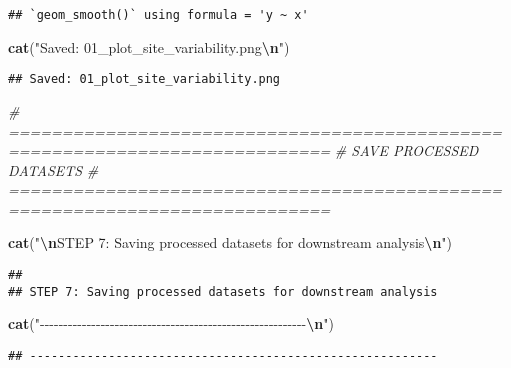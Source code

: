 \documentclass[
]{article}
\newenvironment{Shaded}{\begin{snugshade}}{\end{snugshade}}
\newcommand{\CommentTok}[1]{\textcolor[rgb]{0.56,0.35,0.01}{\textit{#1}}}
\newcommand{\FunctionTok}[1]{\textcolor[rgb]{0.13,0.29,0.53}{\textbf{#1}}}
\newcommand{\NormalTok}[1]{#1}
\newcommand{\SpecialCharTok}[1]{\textcolor[rgb]{0.81,0.36,0.00}{\textbf{#1}}}
\newcommand{\StringTok}[1]{\textcolor[rgb]{0.31,0.60,0.02}{#1}}
\begin{document}
\begin{verbatim}
## `geom_smooth()` using formula = 'y ~ x'
\end{verbatim}

\begin{Shaded}
\begin{Highlighting}[]
\FunctionTok{cat}\NormalTok{(}\StringTok{"Saved: 01\_plot\_site\_variability.png}\SpecialCharTok{\textbackslash{}n}\StringTok{"}\NormalTok{)}
\end{Highlighting}
\end{Shaded}

\begin{verbatim}
## Saved: 01_plot_site_variability.png
\end{verbatim}

\begin{Shaded}
\begin{Highlighting}[]
\CommentTok{\# ============================================================================}
\CommentTok{\# SAVE PROCESSED DATASETS}
\CommentTok{\# ============================================================================}

\FunctionTok{cat}\NormalTok{(}\StringTok{"}\SpecialCharTok{\textbackslash{}n}\StringTok{STEP 7: Saving processed datasets for downstream analysis}\SpecialCharTok{\textbackslash{}n}\StringTok{"}\NormalTok{)}
\end{Highlighting}
\end{Shaded}

\begin{verbatim}
## 
## STEP 7: Saving processed datasets for downstream analysis
\end{verbatim}

\begin{Shaded}
\begin{Highlighting}[]
\FunctionTok{cat}\NormalTok{(}\StringTok{"{-}{-}{-}{-}{-}{-}{-}{-}{-}{-}{-}{-}{-}{-}{-}{-}{-}{-}{-}{-}{-}{-}{-}{-}{-}{-}{-}{-}{-}{-}{-}{-}{-}{-}{-}{-}{-}{-}{-}{-}{-}{-}{-}{-}{-}{-}{-}{-}{-}{-}{-}{-}{-}{-}{-}{-}{-}}\SpecialCharTok{\textbackslash{}n}\StringTok{"}\NormalTok{)}
\end{Highlighting}
\end{Shaded}

\begin{verbatim}
## ---------------------------------------------------------
\end{verbatim}
\end{document}
